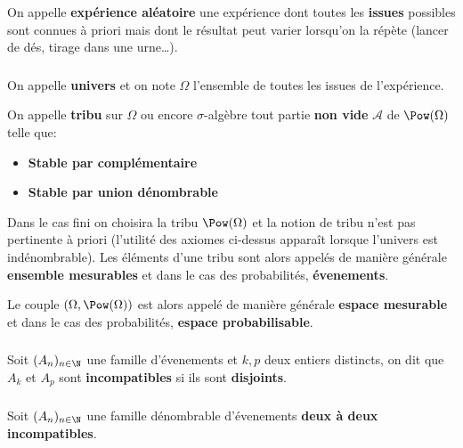 \chapter*{} %

On appelle \textbf{expérience aléatoire} une expérience dont toutes les \textbf{issues} possibles sont connues à priori mais
dont le résultat peut varier lorsqu'on la répète (lancer de dés, tirage dans une urne\ldots).

\subsection*{}
On appelle \textbf{univers} et on note \(\Omega\) l'ensemble de toutes les issues de l'expérience.\+

On appelle \textbf{tribu} sur \(\Omega\) ou encore \(\sigma\)-algèbre tout partie \textbf{non vide} \(\mathscr{A}\) de \(\Pow(\Omega)\) telle que:
\begin{itemize}
   \item \textbf{Stable par complémentaire}
   \item \textbf{Stable par union dénombrable}
\end{itemize}

Dans le cas fini on choisira la tribu \(\Pow(\Omega)\) et la notion de tribu n'est pas pertinente à priori (l'utilité des axiomes ci-dessus apparaît lorsque l'univers est indénombrable).\+
Les éléments d'une tribu sont alors appelés de manière générale \textbf{ensemble mesurables} et dans le cas des probabilités, \textbf{évenements}.\<

Le couple \((\Omega, \Pow(\Omega))\) est alors appelé de manière générale \textbf{espace mesurable} et dans le cas des probabilités, \textbf{espace probabilisable}. 

\subsection*{}
Soit \((A_n)_{n \in \N}\) une famille d'évenements et \(k, p\) deux entiers distincts, on dit que \(A_k\) et \(A_p\) sont \textbf{incompatibles} si ils sont \textbf{disjoints}.

\subsection*{}
Soit \((A_n)_{n \in \N}\) une famille dénombrable d'évenements \textbf{deux à deux incompatibles}.\<


